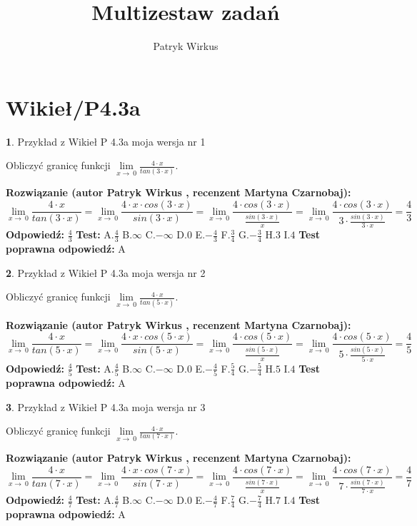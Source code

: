 \documentclass[12pt, a4paper]{article}
\title{Multizestaw zadań}
\author{Patryk Wirkus}
\date{}
\theoremstyle{definition} %
\newtheorem{zad}{}
\newcommand{\kategoria}[1]{\section{#1}}
\newcommand{\zadStart}[1]{\begin{zad}#1\newline}
\newcommand{\zadStop}{\end{zad}}
\newcommand{\rozwStart}[2]{\noindent \textbf{Rozwiązanie (autor #1 , recenzent #2): }\newline}
\newcommand{\rozwStop}{\newline}
\newcommand{\odpStart}{\noindent \textbf{Odpowiedź:}\newline}
\newcommand{\odpStop}{\newline}
\newcommand{\testStart}{\noindent \textbf{Test:}\newline}
\newcommand{\testStop}{\newline}
\newcommand{\kluczStart}{\noindent \textbf{Test poprawna odpowiedź:}\newline}
\newcommand{\kluczStop}{\newline}
\begin{document}
\maketitle

\kategoria{Wikieł/P4.3a}


\zadStart{Przykład z Wikieł P 4.3a moja wersja nr 1}


Obliczyć granicę funkcji $\lim\limits_{x\to\ 0}\frac{4 \cdot x}{tan(3 \cdot x)}$.
\zadStop
\rozwStart{Patryk Wirkus}{Martyna Czarnobaj}
$$\lim\limits_{x\to\ 0}\frac{4 \cdot x}{tan(3 \cdot x)}=\lim\limits_{x\to\ 0}\frac{4 \cdot x \cdot cos(3 \cdot x)}{sin(3 \cdot x)}=\lim\limits_{x\to\ 0}\frac{4 \cdot cos(3 \cdot x)}{\frac{sin(3 \cdot x)}{x}}=\lim\limits_{x\to\ 0}\frac{4 \cdot cos(3 \cdot x)}{3 \cdot \frac{sin(3 \cdot x)}{3 \cdot x}} = \frac{4}{3}$$
\rozwStop
\odpStart
$\frac{4}{3}$
\odpStop
\testStart
A.$\frac{4}{3}$
B.$\infty$
C.$-\infty$
D.$0$
E.$-\frac{4}{3}$
F.$\frac{3}{4}$
G.$-\frac{3}{4}$
H.$3$
I.$4$
\testStop
\kluczStart
A
\kluczStop



\zadStart{Przykład z Wikieł P 4.3a moja wersja nr 2}


Obliczyć granicę funkcji $\lim\limits_{x\to\ 0}\frac{4 \cdot x}{tan(5 \cdot x)}$.
\zadStop
\rozwStart{Patryk Wirkus}{Martyna Czarnobaj}
$$\lim\limits_{x\to\ 0}\frac{4 \cdot x}{tan(5 \cdot x)}=\lim\limits_{x\to\ 0}\frac{4 \cdot x \cdot cos(5 \cdot x)}{sin(5 \cdot x)}=\lim\limits_{x\to\ 0}\frac{4 \cdot cos(5 \cdot x)}{\frac{sin(5 \cdot x)}{x}}=\lim\limits_{x\to\ 0}\frac{4 \cdot cos(5 \cdot x)}{5 \cdot \frac{sin(5 \cdot x)}{5 \cdot x}} = \frac{4}{5}$$
\rozwStop
\odpStart
$\frac{4}{5}$
\odpStop
\testStart
A.$\frac{4}{5}$
B.$\infty$
C.$-\infty$
D.$0$
E.$-\frac{4}{5}$
F.$\frac{5}{4}$
G.$-\frac{5}{4}$
H.$5$
I.$4$
\testStop
\kluczStart
A
\kluczStop



\zadStart{Przykład z Wikieł P 4.3a moja wersja nr 3}


Obliczyć granicę funkcji $\lim\limits_{x\to\ 0}\frac{4 \cdot x}{tan(7 \cdot x)}$.
\zadStop
\rozwStart{Patryk Wirkus}{Martyna Czarnobaj}
$$\lim\limits_{x\to\ 0}\frac{4 \cdot x}{tan(7 \cdot x)}=\lim\limits_{x\to\ 0}\frac{4 \cdot x \cdot cos(7 \cdot x)}{sin(7 \cdot x)}=\lim\limits_{x\to\ 0}\frac{4 \cdot cos(7 \cdot x)}{\frac{sin(7 \cdot x)}{x}}=\lim\limits_{x\to\ 0}\frac{4 \cdot cos(7 \cdot x)}{7 \cdot \frac{sin(7 \cdot x)}{7 \cdot x}} = \frac{4}{7}$$
\rozwStop
\odpStart
$\frac{4}{7}$
\odpStop
\testStart
A.$\frac{4}{7}$
B.$\infty$
C.$-\infty$
D.$0$
E.$-\frac{4}{7}$
F.$\frac{7}{4}$
G.$-\frac{7}{4}$
H.$7$
I.$4$
\testStop
\kluczStart
A
\kluczStop
\end{document}
